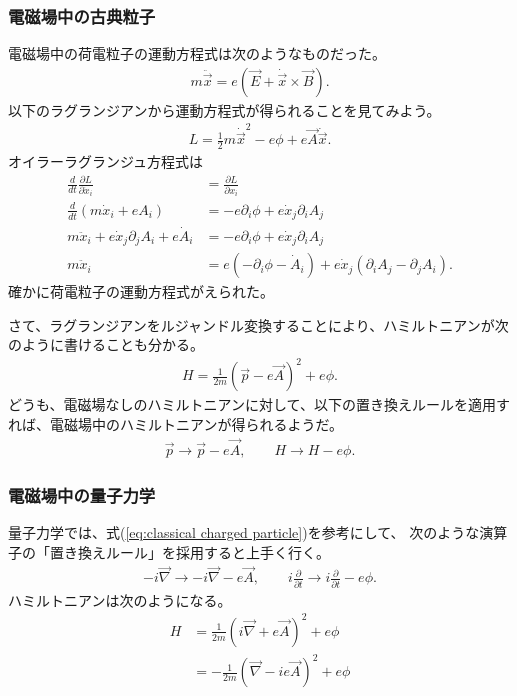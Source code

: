 \documentclass[10pt,a4paper]{jarticle}
\begin{document}
\subsubsection{電磁場中の古典粒子}
電磁場中の荷電粒子の運動方程式は次のようなものだった。
\begin{align}
m \ddot{\vec x} = e (\vec E + \dot{\vec x} \times \vec B).
\end{align}
以下のラグランジアンから運動方程式が得られることを見てみよう。
\begin{align}
L = \frac{1}{2}m \dot{\vec x}^2 - e\phi + e \vec A \dot{\vec x}.
\end{align}
オイラーラグランジュ方程式は
\begin{align}
\frac{d}{dt}\frac{\partial L}{\partial \dot x_i} &= \frac{\partial L}{\partial x_i}\nonumber\\
\frac{d}{dt}( m \dot x_i + e A_i ) &=  - e\partial_i \phi + e \dot x_j \partial_i A_j \nonumber\\
m\ddot x_i + e \dot x_j \partial_j A_i + e \dot A_i &= - e\partial_i \phi + e \dot x_j \partial_i A_j \nonumber\\
m\ddot x_i &= e( -\partial_i \phi - \dot A_i) + e \dot x_j (\partial_i A_j - \partial_j A_i).
\end{align}
確かに荷電粒子の運動方程式がえられた。


さて、ラグランジアンをルジャンドル変換することにより、ハミルトニアンが次のように書けることも分かる。
\begin{align}
H = \frac{1}{2m}( \vec p - e \vec A  )^2 + e \phi.
\end{align}
%
どうも、電磁場なしのハミルトニアンに対して、以下の置き換えルールを適用すれば、電磁場中のハミルトニアンが得られるようだ。
\begin{align}
\vec p \to \vec p - e \vec A, \qquad
H \to H - e \phi. \label{eq:classical charged particle}
\end{align}

\subsubsection{電磁場中の量子力学}
量子力学では、式(\ref{eq:classical charged particle})を参考にして、
次のような演算子の「置き換えルール」を採用すると上手く行く。
\begin{align}
-i \vec\nabla \to -i \vec\nabla - e \vec A, \qquad
i \frac{\partial}{\partial t} \to i \frac{\partial}{\partial t} - e \phi.
\end{align}
%
ハミルトニアンは次のようになる。
\begin{align}
H
&= \frac{1}{2m}(i\vec \nabla + e\vec A)^2 + e\phi \nonumber\\
&= -\frac{1}{2m}(\vec \nabla -i e\vec A)^2 + e\phi \label{eq:hamiltonian NRQM}
\end{align}
\end{document}
